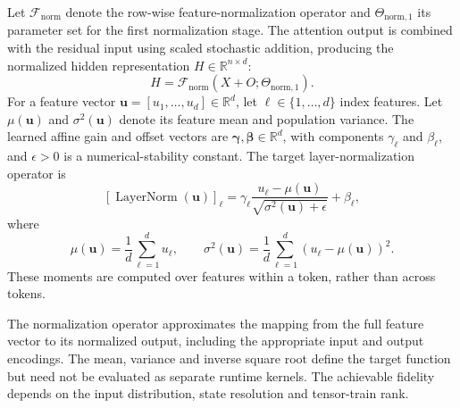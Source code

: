 \documentclass[pdflatex,sn-mathphys-num]{sn-jnl}
\theoremstyle{thmstyleone}
\theoremstyle{thmstyletwo}
\theoremstyle{thmstylethree}
\begin{document}
Let $\mathcal{F}_{\mathrm{norm}}$ denote the row-wise feature-normalization operator and $\Theta_{\mathrm{norm},1}$ its parameter set for the first normalization stage. The attention output is combined with the residual input using scaled stochastic addition, producing the normalized hidden representation $H\in\mathbb{R}^{n\times d}$:
\begin{equation}
H = \mathcal{F}_{\mathrm{norm}} \left( X+O; \Theta_{\mathrm{norm},1} \right). \label{eq:frost_first_normalization}
\end{equation}
For a feature vector $\boldsymbol{u}=[u_1,\ldots,u_d]\in\mathbb{R}^{d}$, let $\ell\in\{1,\ldots,d\}$ index features. Let $\mu(\boldsymbol{u})$ and $\sigma^2(\boldsymbol{u})$ denote its feature mean and population variance. The learned affine gain and offset vectors are $\boldsymbol{\gamma},\boldsymbol{\beta}\in\mathbb{R}^{d}$, with components $\gamma_{\ell}$ and $\beta_{\ell}$, and $\epsilon>0$ is a numerical-stability constant. The target layer-normalization operator is~\cite{ba2016layer}
\begin{equation}
\left[ \operatorname{LayerNorm}(\boldsymbol{u}) \right]_{\ell} = \gamma_{\ell} \frac{ u_{\ell}-\mu(\boldsymbol{u}) }{ \sqrt{\sigma^2(\boldsymbol{u})+\epsilon} } + \beta_{\ell}, \label{eq:layernorm_definition}
\end{equation}
where
\begin{equation}
\mu(\boldsymbol{u}) = \frac{1}{d}\sum_{\ell=1}^{d}u_{\ell}, \qquad \sigma^2(\boldsymbol{u}) = \frac{1}{d} \sum_{\ell=1}^{d} \left( u_{\ell}-\mu(\boldsymbol{u}) \right)^2.
\end{equation}
These moments are computed over features within a token, rather than across tokens.

The normalization operator approximates the mapping from the full feature vector to its normalized output, including the appropriate input and output encodings. The mean, variance and inverse square root define the target function but need not be evaluated as separate runtime kernels. The achievable fidelity depends on the input distribution, state resolution and tensor-train rank.
\end{document}

